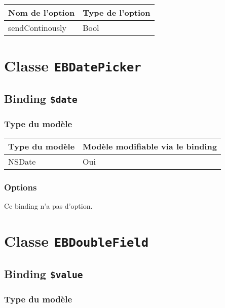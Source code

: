 \begin{tabular}{|l|l|}
\hline
\textbf{Nom de l'option} & \textbf{Type de l'option}\\
\hline
sendContinously & Bool\\
\hline
\end{tabular}







\section{Classe \texttt{EBDatePicker}}

\subsection{Binding \texttt{\$date}}

\subsubsection{Type du modèle}

\begin{tabular}{|l|l|}
\hline
\textbf{Type du modèle} & \textbf{Modèle modifiable via le binding}\\
\hline
NSDate & Oui\\
\hline
\end{tabular}
\subsubsection{Options}

Ce binding n'a pas d'option.








\section{Classe \texttt{EBDoubleField}}

\subsection{Binding \texttt{\$value}}

\subsubsection{Type du modèle}

